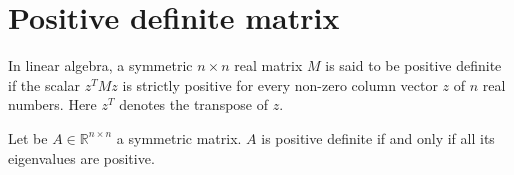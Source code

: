 \section{Positive definite matrix}
In linear algebra, a symmetric \( n \times n \) real matrix \( M \) is said to be positive definite if the scalar \( z^TMz \) is strictly positive for every non-zero column vector \( z \) of \( n \) real numbers. Here \( z^T \) denotes the transpose of \( z \).

Let be \( A \in \mathbb{R}^{n \times n} \) a symmetric matrix. \( A \) is positive definite if and only if all its eigenvalues are positive.

